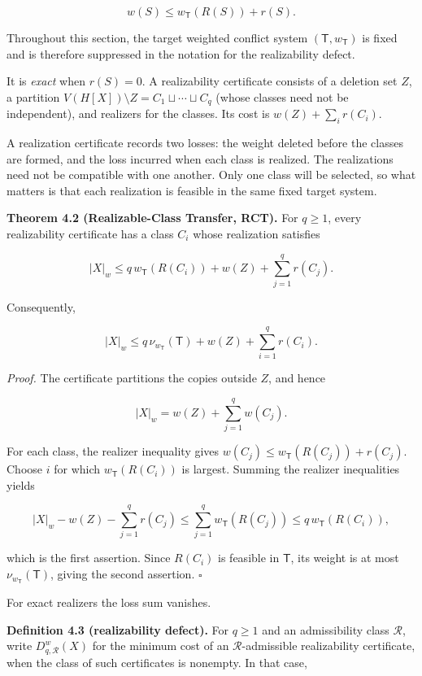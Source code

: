 \documentclass[english,11pt,a4paper]{article}
\newcounter{none}
\begin{document}
\[
w(S)\le w_{\mathsf T}(R(S))+r(S).
\]

Throughout this section, the target weighted conflict system
\((\mathsf T,w_{\mathsf T})\) is fixed and is therefore suppressed in
the notation for the realizability defect.

It is \emph{exact} when \(r(S)=0\). A realizability certificate consists
of a deletion set \(Z\), a partition
\(V(H[X])\setminus Z=C_1\sqcup\cdots\sqcup C_q\) (whose classes need not
be independent), and realizers for the classes. Its cost is
\(w(Z)+\sum_i r(C_i)\).

A realization certificate records two losses: the weight deleted before
the classes are formed, and the loss incurred when each class is
realized. The realizations need not be compatible with one another. Only
one class will be selected, so what matters is that each realization is
feasible in the same fixed target system.

\textbf{Theorem 4.2 (Realizable-Class Transfer, RCT).} For \(q\ge1\),
every realizability certificate has a class \(C_i\) whose realization
satisfies

\[
|X|_w\le q\,w_{\mathsf T}(R(C_i))+w(Z)+\sum_{j=1}^q r(C_j).
\]

Consequently,

\[
|X|_w\le q\,\nu_{w_{\mathsf T}}(\mathsf T)+w(Z)+\sum_{i=1}^q r(C_i).
\]

\emph{Proof.} The certificate partitions the copies outside \(Z\), and
hence

\[
|X|_w=w(Z)+\sum_{j=1}^q w(C_j).
\]

For each class, the realizer inequality gives
\(w(C_j)\le w_{\mathsf T}(R(C_j))+r(C_j)\). Choose \(i\) for which
\(w_{\mathsf T}(R(C_i))\) is largest. Summing the realizer inequalities
yields

\[
|X|_w-w(Z)-\sum_{j=1}^q r(C_j)
\le \sum_{j=1}^q w_{\mathsf T}(R(C_j))
\le q\,w_{\mathsf T}(R(C_i)),
\]

which is the first assertion. Since \(R(C_i)\) is feasible in
\(\mathsf T\), its weight is at most \(\nu_{w_{\mathsf T}}(\mathsf T)\),
giving the second assertion. \(\square\)

For exact realizers the loss sum vanishes.

\textbf{Definition 4.3 (realizability defect).} For \(q\ge1\) and an
admissibility class \(\mathcal R\), write \(D^w_{q,\mathcal R}(X)\) for
the minimum cost of an \(\mathcal R\)-admissible realizability
certificate, when the class of such certificates is nonempty. In that
case,
\end{document}
